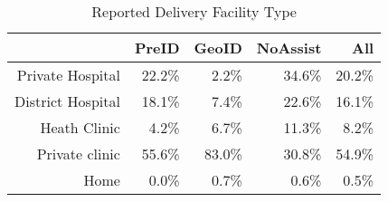 \begin{table}[ht]
\centering
\begin{tabular}{rrrrr}
  \hline
 & PreID & GeoID & NoAssist & All \\ 
  \hline
Private Hospital & 22.2\% & 2.2\% & 34.6\% & 20.2\% \\ 
  District Hospital & 18.1\% & 7.4\% & 22.6\% & 16.1\% \\ 
  Heath Clinic & 4.2\% & 6.7\% & 11.3\% & 8.2\% \\ 
  Private clinic & 55.6\% & 83.0\% & 30.8\% & 54.9\% \\ 
  Home & 0.0\% & 0.7\% & 0.6\% & 0.5\% \\ 
   \hline
\end{tabular}
\caption{Reported Delivery Facility Type} 
\end{table}
